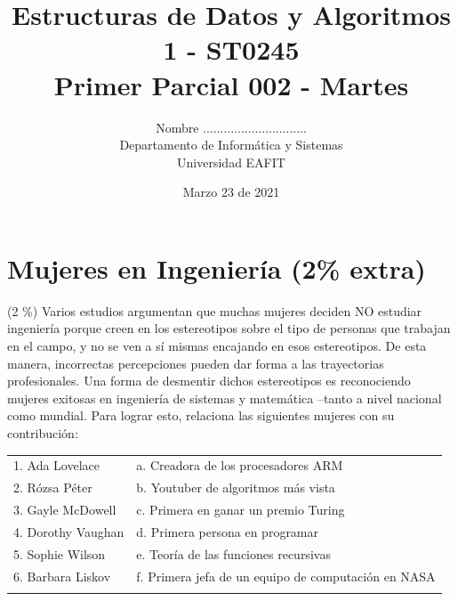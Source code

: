 \documentclass[10 pt]{article}
\title{\textbf {Estructuras de Datos y Algoritmos 1 - ST0245\\Primer Parcial 002 - Martes}}
\author{Nombre ..............................\\
		Departamento de Informática y Sistemas\\
		Universidad EAFIT\\}
\date{Marzo 23 de 2021}
\begin{document}

\lstset{language=Java,frame=none, breaklines=true, numbers = left, stepnumber = 1, xleftmargin=5.0ex, showstringspaces=false, showspaces=false }
\lstset{language=Python,frame=none, breaklines=true, numbers = left, stepnumber = 1, xleftmargin=5.0ex, showstringspaces=false,showspaces=false }
\maketitle

\section{Mujeres en Ingeniería (2\% extra)}
 (2 \%) Varios estudios argumentan que muchas mujeres deciden NO estudiar ingeniería porque creen en los estereotipos sobre el tipo de personas que trabajan en el campo, y no se ven a sí mismas encajando en esos estereotipos. De esta manera, incorrectas percepciones pueden dar forma a las trayectorias profesionales. Una forma de desmentir dichos estereotipos es reconociendo mujeres exitosas en ingeniería de sistemas y matemática --tanto a nivel nacional como mundial. Para lograr esto, relaciona las siguientes mujeres con su contribución:


 \hspace{1cm}



\begin{tabular}{l l}
1. Ada Lovelace &  a. Creadora de los procesadores ARM \\
2. Rózsa Péter &  b. Youtuber de algoritmos más vista\\
3. Gayle McDowell &  c. Primera en ganar un premio Turing\\
4. Dorothy Vaughan &  d. Primera persona en programar\\
5. Sophie Wilson &  e. Teoría de las funciones recursivas \\
6. Barbara Liskov &  f. Primera jefa de un equipo de computación en NASA \\
\\
 \end{tabular}
 
\end{document}

